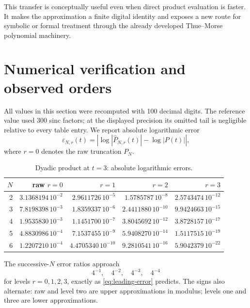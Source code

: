 \documentclass[11pt]{article}
\theoremstyle{definition}
\theoremstyle{remark}
\begin{document}
This transfer is conceptually useful even when direct product evaluation is faster. It makes the approximation a finite digital identity and exposes a new route for symbolic or formal treatment through the already developed Thue--Morse polynomial machinery.

\section{Numerical verification and observed orders}
\label{sec:numerics}

All values in this section were recomputed with 100 decimal digits. The reference value used 300 sinc factors; at the displayed precision its omitted tail is negligible relative to every table entry. We report absolute logarithmic error
\[
\varepsilon_{N,r}(t)=
\left|\log|\widehat P_{N,r}(t)|-\log|P(t)|\right|,
\]
where $r=0$ denotes the raw truncation $P_N$.

\begin{table}[htbp]
\centering
\caption{Dyadic product at $t=3$: absolute logarithmic errors.}
\label{tab:numeric-t3}
\begin{tabular}{@{}r r r r r@{}}
\toprule
$N$ & raw $r=0$ & $r=1$ & $r=2$ & $r=3$ \\
\midrule
2 & $3.1368194\,10^{-2}$ & $2.9611726\,10^{-5}$ & $1.5785787\,10^{-8}$ & $2.5743474\,10^{-12}$ \\
3 & $7.8198398\,10^{-3}$ & $1.8359337\,10^{-6}$ & $2.4411880\,10^{-10}$ & $9.9424663\,10^{-15}$ \\
4 & $1.9535830\,10^{-3}$ & $1.1451700\,10^{-7}$ & $3.8045692\,10^{-12}$ & $3.8728157\,10^{-17}$ \\
5 & $4.8830986\,10^{-4}$ & $7.1537455\,10^{-9}$ & $5.9408270\,10^{-14}$ & $1.5117515\,10^{-19}$ \\
6 & $1.2207210\,10^{-4}$ & $4.4705340\,10^{-10}$ & $9.2810541\,10^{-16}$ & $5.9042379\,10^{-22}$ \\
\bottomrule
\end{tabular}
\end{table}

The successive-$N$ error ratios approach
\[
4^{-1},\quad4^{-2},\quad4^{-3},\quad4^{-4}
\]
for levels $r=0,1,2,3$, exactly as \cref{eq:leading-error} predicts. The signs also alternate: raw and level two are upper approximations in modulus; levels one and three are lower approximations.
\end{document}
